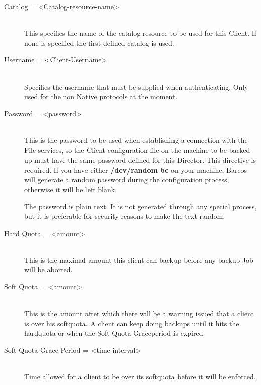 \begin{description}
\item [Catalog = {\textless}Catalog-resource-name{\textgreater}] \hfill \\
This specifies the  name of the catalog resource to be used for this Client.
If none is specified the first defined catalog is used.

\item [Username = {\textless}Client-Username{\textgreater}] \hfill \\
Specifies the username that must be supplied when authenticating.
Only used for the non Native protocols at the moment.

\item [Password = {\textless}password{\textgreater}] \hfill \\
This is the password to be  used when establishing a connection with the File
services, so  the Client configuration file on the machine to be backed up
must  have the same password defined for this Director. This directive is
required.  If you have either {\bf /dev/random}  {\bf bc} on your machine,
Bareos will generate a random  password during the configuration process,
otherwise it will  be left blank.

The password is plain text.  It is not generated through any special
process, but it is preferable for security reasons to make the text
random.

\item [Hard Quota = {\textless}amount{\textgreater}] \hfill \\
This is the maximal amount this client can backup before any backup Job
will be aborted.

\item [Soft Quota = {\textless}amount{\textgreater}] \hfill \\
This is the amount after which there will be a warning issued that a client
is over his softquota. A client can keep doing backups until it hits the
hardquota or when the Soft Quota Graceperiod is expired.

\item [Soft Quota Grace Period = {\textless}time interval{\textgreater}] \hfill \\
Time allowed for a client to be over its softquota before it will be enforced.


\end{description}
